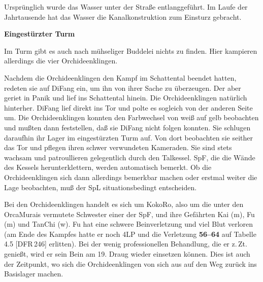 \documentclass[
a4paper,
twoside,
DIV=calc,
BCOR=4mm,
fontsize=9pt,
twocolumn=on,
titlepage=on,
parskip=half
]{scrartcl}
\begin{document}

Ursprünglich wurde das Wasser unter der Straße entlanggeführt. Im
Laufe der Jahrtausende hat das Wasser die Kanalkonstruktion zum
Einsturz gebracht.

\textbf{ Eingestürzter Turm}


Im Turm gibt es auch nach mühseliger Buddelei nichts zu finden. Hier
kampieren allerdings die vier Orchideenklingen.

Nachdem die Orchideenklingen den Kampf im Schattental beendet hatten,
redeten sie auf DiFang ein, um ihn von ihrer Sache zu überzeugen. Der
aber geriet in Panik und lief ins Schattental hinein. Die
Orchideenklingen natürlich hinterher. DiFang lief direkt ins Tor und
polte es sogleich von der anderen Seite um. Die Orchideenklingen
konnten den Farbwechsel von weiß auf gelb beobachten und mußten dann
feststellen, daß sie DiFang nicht folgen konnten. Sie schlugen
daraufhin ihr Lager im eingestürzten Turm auf. Von dort beobachten sie
seither das Tor und pflegen ihren schwer verwundeten Kameraden. Sie
sind stets wachsam und patroullieren gelegentlich durch den
Talkessel. SpF, die die Wände des Kessels herunterklettern, werden
automatisch bemerkt. Ob die Orchideenklingen sich dann allerdings
bemerkbar machen oder erstmal weiter die Lage beobachten, muß der SpL
situationsbedingt entscheiden.

Bei den Orchideenklingen handelt es sich um KokoRo, also um die unter
den OrcaMurais vermutete Schwester einer der SpF, und ihre Gefährten
Kai (m), Fu (m) und TanChi (w). Fu hat eine schwere Beinverletzung und
viel Blut verloren (am Ende des Kampfes hatte er noch 4LP und die
Verletzung \textbf{56--64} auf Tabelle 4.5 [DFR\,246] erlitten). Bei
der wenig professionellen Behandlung, die er z.\,Zt. genießt, wird er
sein Bein am 19. Draug wieder einsetzen können. Dies ist auch der
Zeitpunkt, wo sich die Orchideenklingen von sich aus auf den Weg
zurück ins Basislager machen.
\end{document}

